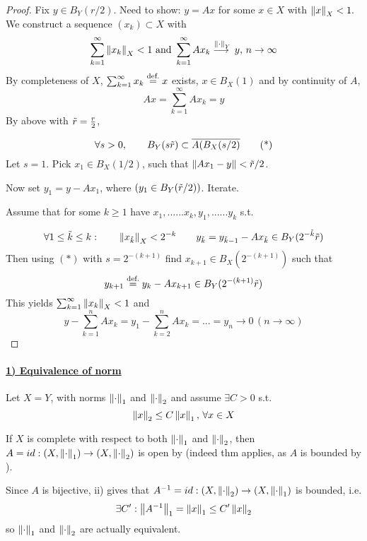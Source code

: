 \documentclass{article}
\begin{document}
\begin{proof}
Fix $y\in B_Y(r/2)$. Need to show: $y=Ax$ for some $x\in X$ with $\left\|{x}\right\|_X<1.$\\
We construct a sequence $(x_k)\subset X$ with 
$$
\sum_{k=1}^\infty \left\|{x_k}\right\|_X<1\,\,\text{and}\,\,\sum_{k=1}^\infty Ax_k\stackrel{\left\|{\cdot}\right\|_Y}{\longrightarrow{}}y,\,n\to\infty
$$
By completeness of $X$, $\sum_{k=1}^\infty x_k\stackrel{\text{def.}}{=} x$ exists, $x\in B_X(1)$ and by continuity of $A$,
$$Ax=\sum_{k=1}^\infty Ax_k=y$$
By  above with $\Tilde{r}=\frac{r}{2}$,  

\begin{equation*}
    \forall s>0, \qquad B_Y(s\Tilde{r})\subset \overline{A(B_X(s/2)}
    \tag{*}
\end{equation*}
Let $s=1$. Pick $x_1\in B_X(1/2)$, such that $\left\|{Ax_1-y}\right\|<\Tilde{r}/2$. 

Now set $y_1=y-Ax_1$, where $(y_1 \in B_Y(\Tilde{r}/2))$. Iterate.  

Assume that for some $k \geq 1$ have $x_1,......x_k,y_1,......y_k$ s.t.

$$
\forall 1\leq\tilde{k}\leq k:\qquad \left\|{x_{\Tilde{k}}}\right\|_X < 2^{-k}\qquad y_{\tilde{k}}=y_{\tilde{k}-1}-Ax_{\tilde{k}}\in B_Y(2^{-\Tilde{k}}\Tilde{r})
$$
Then using $(*)$ with $s=2^{-(k+1)}$ find $x_{k+1}\in B_X(2^{-(k+1)})$ such that
$$
y_{k+1}\stackrel{\text{def.}}{=} y_k-Ax_{k+1}\in B_Y(2^{-(k+1)}\Tilde{r})
$$
This yields $\sum_{k=1}^{\infty}\left\|{x_k}\right\|_X<1$ and 
$$
y-\sum_{k=1}^n Ax_k=y_1-\sum_{k=2}^n Ax_k=...=y_n\to0\,(n\to \infty)
$$
\end{proof}

\paragraph{\underline{\textbf{1) Equivalence of norm}}}

\begin{example}\nl
Let $X=Y$, with norms $\left\|{\cdot}\right\|_1$ and $\left\|{\cdot}\right\|_2$ and assume $\exists C>0$ s.t.
\begin{equation}
\label{equivalence of norm example}
    \left\|{x}\right\|_2\leq C\left\|{x}\right\|_1,\,\forall x\in X
\end{equation}

If $X$ is complete with respect to both $\left\|{\cdot}\right\|_1$ and $\left\|{\cdot}\right\|_2$, then $A=id:(X,\left\|{\cdot}\right\|_1)\to(X,\left\|{\cdot}\right\|_2)$ is open by  (indeed thm applies, as $A$ is bounded by ). 

Since $A$ is bijective, ii) gives that $A^{-1}=id:(X,\left\|{\cdot}\right\|_2)\to(X,\left\|{\cdot}\right\|_1)$ is bounded, i.e.
$$
\exists C': \left\|{A^{-1}}\right\|_1=\left\|{x}\right\|_1\leq C'\left\|{x}\right\|_2
$$
so $\left\|{\cdot}\right\|_1$ and $\left\|{\cdot}\right\|_2$ are actually equivalent.
\end{example}
\end{document}
